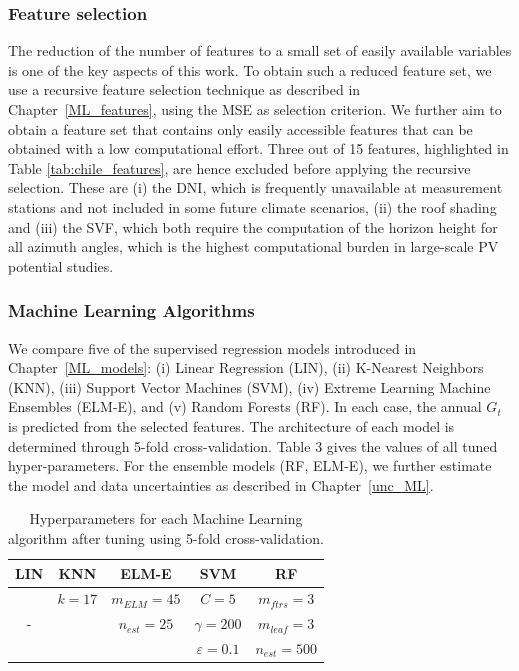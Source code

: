 \subsubsection{Feature selection}
\label{chile_ftrSelect}
The reduction of the number of features to a small set of easily available variables is one of the key aspects of this work. To obtain such a reduced feature set, we use a recursive feature selection technique as described in Chapter~\ref{ML_features}, using the MSE as selection criterion.
We further aim to obtain a feature set that contains only easily accessible features that can be obtained with a low computational effort. Three out of 15 features, highlighted in Table \ref{tab:chile_features}, are hence excluded before applying the recursive selection. These are (i) the DNI, which is frequently unavailable at measurement stations and not included in some future climate scenarios, (ii) the roof shading and (iii) the SVF, which both require the computation of the horizon height for all azimuth angles, which is the highest computational burden in large-scale PV potential studies. 

\subsubsection{Machine Learning Algorithms}

We compare five of the supervised regression models introduced in Chapter~\ref{ML_models}: (i) Linear Regression (LIN), (ii) K-Nearest Neighbors (KNN), (iii) Support Vector Machines (SVM), (iv) Extreme Learning Machine Ensembles (ELM-E), and (v) Random Forests (RF). In each case, the annual $G_t$ is predicted from the selected features. The architecture of each model is determined through 5-fold cross-validation. Table 3 gives the values of all tuned hyper-parameters. 
For the ensemble models (RF, ELM-E), we further estimate the model and data uncertainties as described in Chapter~\ref{unc_ML}.

\begin{table}[tb]
\centering
\footnotesize
\caption{Hyperparameters for each Machine Learning algorithm after tuning using 5-fold cross-validation.}
\label{tab:chile_hyperparams}
\begin{tabular}{ccccc}
\hline
\textbf{LIN}       & \textbf{KNN}      & \textbf{ELM-E}     & \textbf{SVM}     & \textbf{RF}         \\\hline
\multirow{3}{*}{-} & $k = 17$   & $m_{ELM} = 45$ & $C = 5 $  & $m_{ftrs} = 3$  \\
                   & \multirow{2}{*}{} & $n_{est} = 25$ &  $\gamma = 200$ & $m_{leaf} = 3$  \\
                   &                   &                    & $\varepsilon = 0.1$ & $n_{est} = 500$\\
\hline
\end{tabular}
\end{table}

